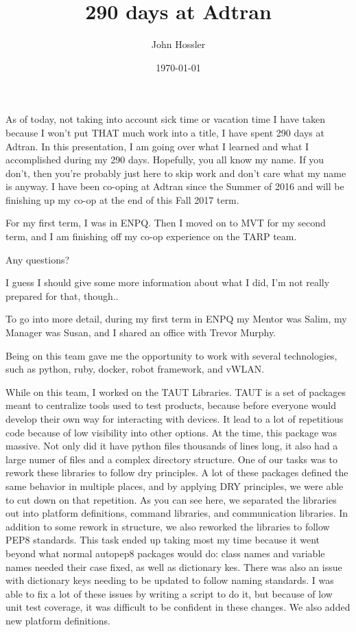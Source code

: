 \documentclass[12pt, letterpaper]{article}
\title{290 days at Adtran}
\author{John Hossler}
\date{\today}
\begin{document}
\maketitle

\par
As of today, not taking into account sick time or vacation time I have taken because I won't put THAT much work into a title, I have spent 290 days at Adtran.
In this presentation, I am going over what I learned and what I accomplished during my 290 days.
Hopefully, you all know my name. If you don't, then you're probably just here to skip work and
don't care what my name is anyway. I have been co-oping at Adtran since the Summer of 2016 and will be finishing up my co-op at the end of this Fall 2017 term.
\par
For my first term, I was in ENPQ. Then I moved on to MVT for my second term, and I am finishing off my co-op experience on the TARP team.
\par
Any questions?

I guess I should give some more information about what I did, I'm not really prepared for that, though..

\par
To go into more detail, during my first term in ENPQ my Mentor was Salim, my Manager was Susan, and I shared an office with Trevor Murphy.

\par
Being on this team gave me the opportunity to work with several technologies, such as python, ruby, docker, robot framework, and vWLAN.

\par
While on this team, I worked on the TAUT Libraries. TAUT is a set of packages meant to centralize tools used to test products, because before everyone would develop their own way for interacting with devices. It lead to a lot of repetitious code because of low visibility into other options. At the time, this package was
massive. Not only did it have python files thousands of lines long, it also had a large numer of
files and a complex directory structure. One of our tasks was to rework these libraries to follow
dry principles. A lot of these packages defined the same behavior in multiple places, and by
applying DRY principles, we were able to cut down on that repetition. As you can see here, we
separated the libraries out into platform definitions, command libraries, and communication
libraries. In addition to some rework in structure, we also reworked the libraries to follow PEP8
standards. This task ended up taking most my time because it went beyond what normal autopep8
packages would do: class names and variable names needed their case fixed, as well as dictionary
kes. There was also an issue with dictionary keys needing to be updated to follow naming standards.
I was able to fix a lot of these issues by writing a script to do it, but because of low unit test
coverage, it was difficult to be confident in these changes. We also added new platform
definitions.
\end{document}
